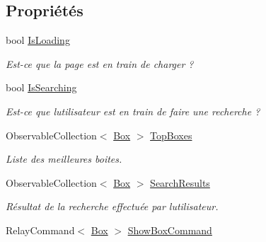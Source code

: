 \subsection*{Propriétés}
\begin{DoxyCompactItemize}
\item 
bool \hyperlink{class_boxes_1_1_view_models_1_1_discover_view_model_a8979aad196a45eb8c7de27c8d9650dfa}{Is\+Loading}
\begin{DoxyCompactList}\small\item\em Est-\/ce que la page est en train de charger ? \end{DoxyCompactList}\item 
bool \hyperlink{class_boxes_1_1_view_models_1_1_discover_view_model_aedda1c3e0c8e0d0269aad154ce7132f2}{Is\+Searching}
\begin{DoxyCompactList}\small\item\em Est-\/ce que l\textquotesingle{}utilisateur est en train de faire une recherche ? \end{DoxyCompactList}\item 
Observable\+Collection$<$ \hyperlink{class_boxes_1_1_models_1_1_box}{Box} $>$ \hyperlink{class_boxes_1_1_view_models_1_1_discover_view_model_a1b4b81f645af78ea5ca8f7de5ced39a3}{Top\+Boxes}
\begin{DoxyCompactList}\small\item\em Liste des meilleures boites. \end{DoxyCompactList}\item 
Observable\+Collection$<$ \hyperlink{class_boxes_1_1_models_1_1_box}{Box} $>$ \hyperlink{class_boxes_1_1_view_models_1_1_discover_view_model_a73bfae617de24675afc97332aca4d78a}{Search\+Results}
\begin{DoxyCompactList}\small\item\em Résultat de la recherche effectuée par l\textquotesingle{}utilisateur. \end{DoxyCompactList}\item 
Relay\+Command$<$ \hyperlink{class_boxes_1_1_models_1_1_box}{Box} $>$ \hyperlink{class_boxes_1_1_view_models_1_1_discover_view_model_adc536e0351a3e5ac210564ec78de6e3f}{Show\+Box\+Command}

\end{DoxyCompactItemize}
